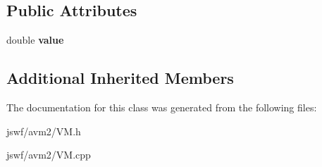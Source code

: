 \subsection*{Public Attributes}
\begin{DoxyCompactItemize}
\item 
\hypertarget{classjswf_1_1avm2_1_1_double_object_a5c5cc9b23b45c457e5570a582400eff4}{double {\bfseries value}}\label{classjswf_1_1avm2_1_1_double_object_a5c5cc9b23b45c457e5570a582400eff4}

\end{DoxyCompactItemize}
\subsection*{Additional Inherited Members}


The documentation for this class was generated from the following files\+:\begin{DoxyCompactItemize}
\item 
jswf/avm2/V\+M.\+h\item 
jswf/avm2/V\+M.\+cpp\end{DoxyCompactItemize}
